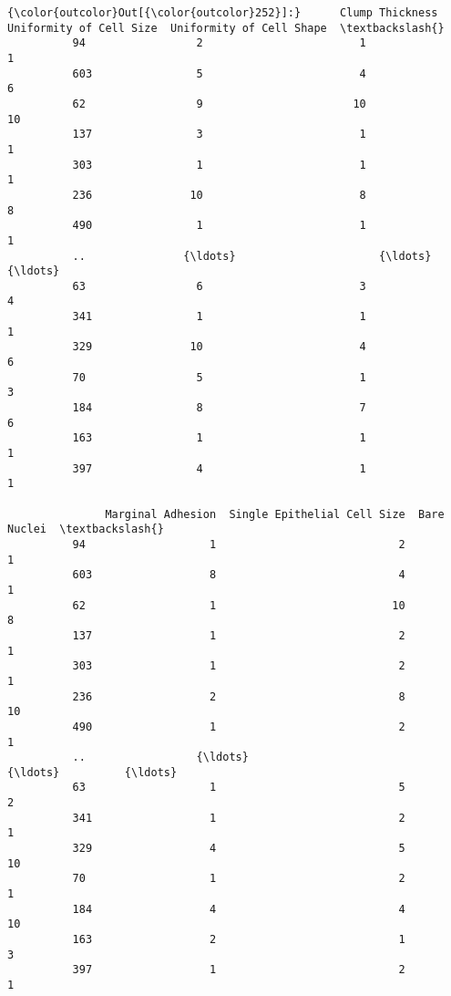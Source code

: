 \documentclass[11pt]{article}
\begin{document}
\begin{Verbatim}[commandchars=\\\{\}]
{\color{outcolor}Out[{\color{outcolor}252}]:}      Clump Thickness  Uniformity of Cell Size  Uniformity of Cell Shape  \textbackslash{}
          94                 2                        1                         1   
          603                5                        4                         6   
          62                 9                       10                        10   
          137                3                        1                         1   
          303                1                        1                         1   
          236               10                        8                         8   
          490                1                        1                         1   
          ..               {\ldots}                      {\ldots}                       {\ldots}   
          63                 6                        3                         4   
          341                1                        1                         1   
          329               10                        4                         6   
          70                 5                        1                         3   
          184                8                        7                         6   
          163                1                        1                         1   
          397                4                        1                         1   
          
               Marginal Adhesion  Single Epithelial Cell Size  Bare Nuclei  \textbackslash{}
          94                   1                            2            1   
          603                  8                            4            1   
          62                   1                           10            8   
          137                  1                            2            1   
          303                  1                            2            1   
          236                  2                            8           10   
          490                  1                            2            1   
          ..                 {\ldots}                          {\ldots}          {\ldots}   
          63                   1                            5            2   
          341                  1                            2            1   
          329                  4                            5           10   
          70                   1                            2            1   
          184                  4                            4           10   
          163                  2                            1            3   
          397                  1                            2            1   
          

\end{Verbatim}
\end{document}
